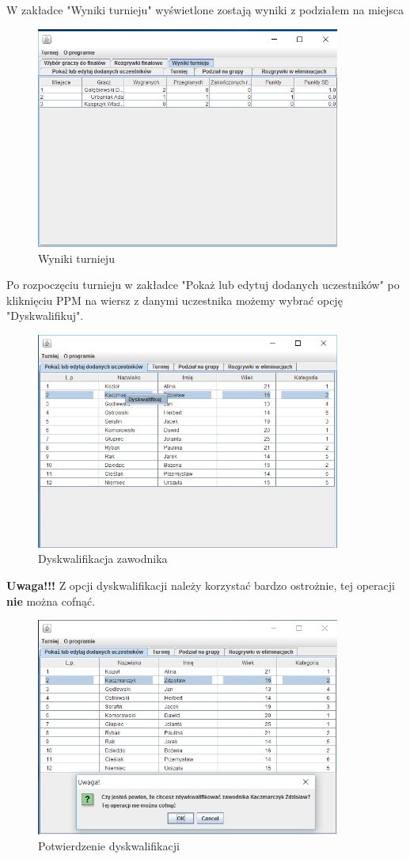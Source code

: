 W zakładce "Wyniki turnieju" wyświetlone zostają wyniki z podziałem na miejsca
\begin{figure}[H]
	\centering
	\includegraphics[width=10cm]{fig/17}
	\caption{Wyniki turnieju}
	\label {fig:wyniki_turnieju} 
\end{figure}
Po rozpoczęciu turnieju w zakładce "Pokaż lub edytuj dodanych uczestników" po kliknięciu PPM na wiersz z danymi uczestnika możemy wybrać opcję "Dyskwalifikuj". 
\begin{figure}[H]
	\centering
	\includegraphics[width=10cm]{fig/18}
	\caption{Dyskwalifikacja zawodnika}
	\label {fig:dyskwalifikacja} 
\end{figure}
\textbf{Uwaga!!!} Z opcji dyskwalifikacji należy korzystać bardzo ostrożnie, tej operacji \textbf{nie} można cofnąć.
\begin{figure}[H]
	\centering
	\includegraphics[width=10cm]{fig/19}
	\caption{Potwierdzenie dyskwalifikacji}
	\label {fig:dyskwalifikacja_potwierdzenie} 
\end{figure}
